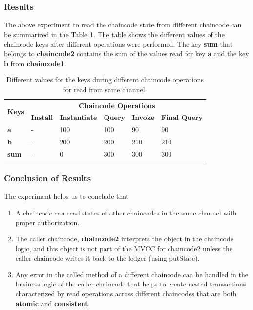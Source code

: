 \documentclass[
  a4paper,  %
  twoside,  %
  bibliography=totoc,
  headsepline,
  cleardoublepage=empty,
  parskip=half,
  draft=false
]{scrbook}
\begin{document}
\subsubsection{Results}
The above experiment to read the chaincode state from different chaincode can be summarized in the Table \ref{tab:result1}. The table shows the different values of the chaincode keys after different operations were performed. The key \textbf{sum} that belongs to \textbf{chaincode2} contains the sum of the values read for key \textbf{a} and the key \textbf{b} from \textbf{chaincode1}.
\begin{table}[h!]
\begin{center}
    \begin{tabular}{ |l|l|l|l|l|l|}
    \hline
    \multirow{2}{*}{\textbf{Keys}} & \multicolumn{5}{c|}{\textbf{Chaincode Operations}}\\ \cline{2-6}
    &\textbf{Install}& \textbf{Instantiate}& \textbf{Query}& \textbf{Invoke}& \textbf{Final Query} \\ \hline
    \textbf{a} & - & 100 & 100 & 90 & 90 \\ \hline
    \textbf{b} & - & 200 & 200 & 210 & 210 \\ \hline
    \textbf{sum} & - & 0 & 300 & 300 & 300 \\ \hline
    \end{tabular}
\end{center}
\caption{Different values for the keys during different chaincode operations for read from same channel.}
    \label{tab:result1}
\end{table}
\subsubsection{Conclusion of Results}
The experiment helps us to conclude that \begin{enumerate}
    \item A chaincode can read states of other chaincodes in the same channel with proper authorization.
    \item The caller chaincode, \textbf{chaincode2} interprets the object in the chaincode logic, and this object is not part of the MVCC for chaincode2 unless the caller chaincode writes it back to the ledger (using putState). 
    \item Any error in the called method of a different chaincode can be handled in the business logic of the caller chaincode that helps to create nested transactions characterized by read operations across different chaincodes that are both \textbf{atomic} and \textbf{consistent}.
\end{enumerate} 
\end{document}
